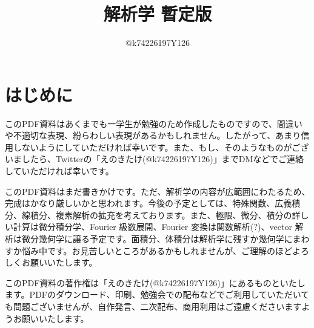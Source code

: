 \documentclass[10pt,a4paper,titlepage]{jsarticle}
\title{解析学 暫定版}
\author{@k74226197Y126}
\begin{document}
\maketitle
{}
\section*{はじめに}
このPDF資料はあくまでも一学生が勉強のため作成したものですので、間違いや不適切な表現、紛らわしい表現があるかもしれません。したがって、あまり信用しないようにしていただければ幸いです。また、もし、そのようなものがございましたら、Twitterの「えのきたけ(@k74226197Y126)」までDMなどでご連絡していただければ幸いです。\par
このPDF資料はまだ書きかけです。ただ、解析学の内容が広範囲にわたるため、完成はかなり厳しいかと思われます。今後の予定としては、特殊関数、広義積分、線積分、複素解析の拡充を考えております。また、極限、微分、積分の詳しい計算は微分積分学、Fourier 級数展開、Fourier 変換は関数解析(?)、vector 解析は微分幾何学に譲る予定です。面積分、体積分は解析学に残すか幾何学にまわすか悩み中です。お見苦しいところがあるかもしれませんが、ご理解のほどよろしくお願いいたします。\par
このPDF資料の著作権は「えのきたけ(@k74226197Y126)」にあるものといたします。PDFのダウンロード、印刷、勉強会での配布などでご利用していただいても問題ございませんが、自作発言、二次配布、商用利用はご遠慮くださいますようお願いいたします。
\tableofcontents
\clearpage
{}


\clearpage

\clearpage

\clearpage

\clearpage

\clearpage

\clearpage

\clearpage

\clearpage

\clearpage


\clearpage

\clearpage

\clearpage

\clearpage


\clearpage

\clearpage

\clearpage

\clearpage

\clearpage

\clearpage

\clearpage

\clearpage


\clearpage

\clearpage

\clearpage

\clearpage


\clearpage


\clearpage

\clearpage

\clearpage


\clearpage

\clearpage

\clearpage

\clearpage

\clearpage

\clearpage

\clearpage


\clearpage

\clearpage

\clearpage

\clearpage

\clearpage

%
%
%
\end{document}
